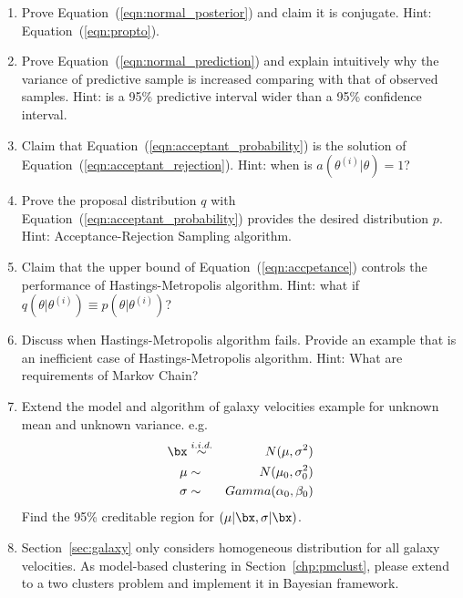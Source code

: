 \begin{enumerate}[label=\thechapter-\arabic*]

\item
Prove Equation~(\ref{eqn:normal_posterior}) and claim it is conjugate.
{\color{blue} Hint: Equation~(\ref{eqn:propto}). }

\item
Prove Equation~(\ref{eqn:normal_prediction}) and explain intuitively why
the variance of predictive sample is increased comparing with that of
observed samples.
{\color{blue} Hint: is a 95\% predictive interval wider than a 95\% confidence
interval. }

\item
Claim that Equation~(\ref{eqn:acceptant_probability}) is the solution of
Equation~(\ref{eqn:acceptant_rejection}).
{\color{blue} Hint: when is $a(\theta^{(i)} | \theta) = 1$? }

\item
Prove the proposal distribution $q$ with
Equation~(\ref{eqn:acceptant_probability}) provides the desired
distribution $p$.
{\color{blue} Hint: Acceptance-Rejection Sampling algorithm. }

\item
Claim that the upper bound of Equation~(\ref{eqn:accpetance}) controls
the performance of Hastings-Metropolis algorithm.
{\color{blue} Hint: what if
$q(\theta | \theta^{(i)}) \equiv p(\theta | \theta^{(i)})$? }

\item
Discuss when Hastings-Metropolis algorithm fails. Provide an example
that is an inefficient case of Hastings-Metropolis algorithm.
{\color{blue} Hint: What are requirements of Markov Chain? }

\item
Extend the model and algorithm of galaxy velocities example
for unknown mean and unknown variance. e.g.
\begin{eqnarray*}
\bx & \stackrel{i.i.d.}{\sim} & N(\mu, \sigma^2) \\
\mu & \sim & N(\mu_0, \sigma_0^2) \\
\sigma & \sim & Gamma(\alpha_0, \beta_0)
\end{eqnarray*}
Find the 95\% creditable region for $(\mu|\bx, \sigma|\bx)$.

\item
Section~\ref{sec:galaxy} only considers homogeneous distribution for all
galaxy velocities. As model-based clustering in Section~\ref{chp:pmclust},
please extend to a two clusters problem and implement it in Bayesian
framework.

\end{enumerate}


